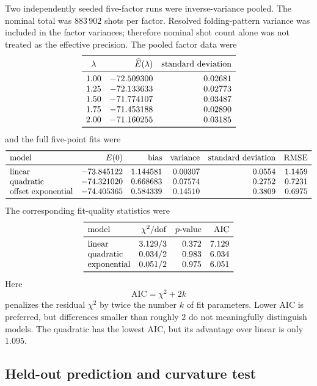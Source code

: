 \documentclass[11pt]{article}
\begin{document}
Two independently seeded five-factor runs were inverse-variance pooled.  The
nominal total was $883\,902$ shots per factor.  Resolved folding-pattern
variance was included in the factor variances; therefore nominal shot count
alone was not treated as the effective precision.  The pooled factor data
were
\[
\begin{array}{crr}
\toprule
\lambda & \widehat E(\lambda) & \text{standard deviation}\\
\midrule
1.00 & -72.509300 & 0.02681\\
1.25 & -72.133633 & 0.02773\\
1.50 & -71.774107 & 0.03487\\
1.75 & -71.453188 & 0.02890\\
2.00 & -71.160255 & 0.03185\\
\bottomrule
\end{array}
\]
and the full five-point fits were
\[
\begin{array}{lrrrrr}
\toprule
\text{model} & E(0) & \text{bias} & \text{variance}
             & \text{standard deviation} & \text{RMSE}\\
\midrule
\text{linear}
  & -73.845122 & 1.144581 & 0.00307 & 0.0554 & 1.1459\\
\text{quadratic}
  & -74.321020 & 0.668683 & 0.07574 & 0.2752 & 0.7231\\
\text{offset exponential}
  & -74.405365 & 0.584339 & 0.14510 & 0.3809 & 0.6975\\
\bottomrule
\end{array}
\]
The corresponding fit-quality statistics were
\[
\begin{array}{lrrr}
\toprule
\text{model} & \chi^2/\mathrm{dof} & p\text{-value} & \mathrm{AIC}\\
\midrule
\text{linear}      & 3.129/3 & 0.372 & 7.129\\
\text{quadratic}   & 0.034/2 & 0.983 & 6.034\\
\text{exponential} & 0.051/2 & 0.975 & 6.051\\
\bottomrule
\end{array}
\]
Here
\[
  \mathrm{AIC}=\chi^2+2k
\]
penalizes the residual $\chi^2$ by twice the number $k$ of fit parameters.
Lower AIC is preferred, but differences smaller than roughly $2$ do not
meaningfully distinguish models.  The quadratic has the lowest AIC, but its
advantage over linear is only $1.095$.

\subsection{Held-out prediction and curvature test}
\end{document}
